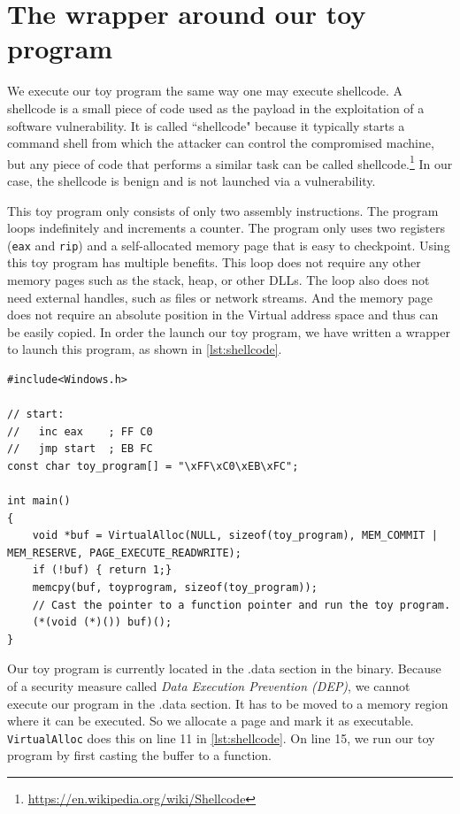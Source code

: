 \documentclass[a4paper, 11pt, english]{report}
\begin{document}
\section{The wrapper around our toy program}
\label{sec:code-shellcode}
We execute our toy program the same way one may execute shellcode. A shellcode is a small piece of code used as the payload in the exploitation of a software vulnerability. It is called ``shellcode" because it typically starts a command shell from which the attacker can control the compromised machine, but any piece of code that performs a similar task can be called shellcode.\footnote{\url{https://en.wikipedia.org/wiki/Shellcode}}
In our case, the shellcode is benign and is not launched via a vulnerability.

This toy program only consists of only two assembly instructions. The program loops indefinitely and increments a counter. The program only uses two registers (\texttt{eax} and \texttt{rip}) and a self-allocated memory page that is easy to checkpoint. Using this toy program has multiple benefits. This loop does not require any other memory pages such as the stack, heap, or other DLLs. The loop also does not need external handles, such as files or network streams. And the memory page does not require an absolute position in the Virtual address space and thus can be easily copied.
In order the launch our toy program, we have written a wrapper to launch this program, as shown in \autoref{lst:shellcode}.

\begin{lstlisting}[float=h,label=lst:shellcode,language={[Visual]C++},caption={The wrapper for our shellcode}]
#include<Windows.h>

// start:
//   inc eax    ; FF C0
//   jmp start  ; EB FC
const char toy_program[] = "\xFF\xC0\xEB\xFC";

int main()
{
	void *buf = VirtualAlloc(NULL, sizeof(toy_program), MEM_COMMIT | MEM_RESERVE, PAGE_EXECUTE_READWRITE);
	if (!buf) { return 1;}
	memcpy(buf, toyprogram, sizeof(toy_program));
	// Cast the pointer to a function pointer and run the toy program.
	(*(void (*)()) buf)();
}
\end{lstlisting}

Our toy program is currently located in the .data section in the binary. Because of a security measure called \textit{Data Execution Prevention (DEP)}, we cannot execute our program in the .data section. 
It has to be moved to a memory region where it can be executed. So we allocate a page and mark it as executable. \texttt{VirtualAlloc} does this on line 11 in \autoref{lst:shellcode}. On line 15, we run our toy program by first casting the buffer to a function.
\end{document}
